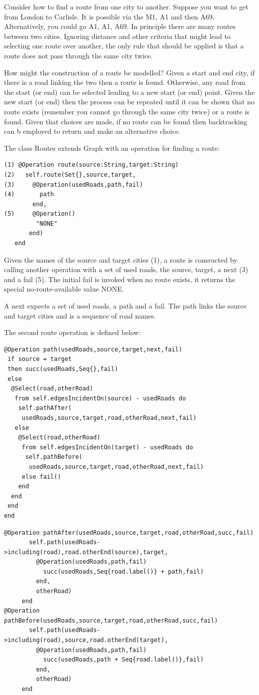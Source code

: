 Consider how to find a route from one city to another. Suppose you
want to get from London to Carlisle. It is possible via the M1, A1
and then A69. Alternatively, you could go A1, A1, A69. In principle
there are many routes between two cities. Ignoring distance and other
criteria that might lead to selecting one route over another, the
only rule that should be applied is that a route does not pass through
the same city twice.

How might the construction of a route be modelled? Given a start and
end city, if there is a road linking the two then a route is found.
Otherwise, any road from the start (or end) can be selected leading
to a new start (or end) point. Given the new start (or end) then the
process can be repeated until it can be shown that no route exists
(remember you cannot go through the same city twice) or a route is
found. Given that choices are made, if no route can be found then
backtracking can b employed to return and make an alternative choice.

The class Routes extends Graph with an operation for finding a route:

\begin{lstlisting}
(1) @Operation route(source:String,target:String)
(2)   self.route(Set{},source,target,
(3)     @Operation(usedRoads,path,fail) 
(4)       path 
        end,
(5)     @Operation() 
         "NONE" 
       end)
   end
\end{lstlisting}Given the names of the source and target cities (1), a route is consructed
by calling another operation with a set of used roads, the source,
target, a next (3) and a fail (5). The initial fail is invoked when
no route exists, it returns the special no-route-available value NONE.

A next expects a set of used roads, a path and a fail. The path links
the source and target cities and is a sequence of road names.

The second route operation is defined below:

\begin{lstlisting}
@Operation path(usedRoads,source,target,next,fail)
 if source = target
 then succ(usedRoads,Seq{},fail)
 else
  @Select(road,otherRoad) 
   from self.edgesIncidentOn(source) - usedRoads do 
    self.pathAfter(
     usedRoads,source,target,road,otherRoad,next,fail)
   else 
    @Select(road,otherRoad) 
     from self.edgesIncidentOn(target) - usedRoads do
      self.pathBefore(
       usedRoads,source,target,road,otherRoad,next,fail)
     else fail()
    end
  end
 end
end
\end{lstlisting}\begin{lstlisting}
@Operation pathAfter(usedRoads,source,target,road,otherRoad,succ,fail)
       self.path(usedRoads->including(road),road.otherEnd(source),target,
         @Operation(usedRoads,path,fail)
           succ(usedRoads,Seq{road.label()} + path,fail)
         end,
         otherRoad)
     end
@Operation pathBefore(usedRoads,source,target,road,otherRoad,succ,fail)
       self.path(usedRoads->including(road),source,road.otherEnd(target),
         @Operation(usedRoads,path,fail)
           succ(usedRoads,path + Seq{road.label()},fail)
         end,
         otherRoad)
     end
\end{lstlisting}
